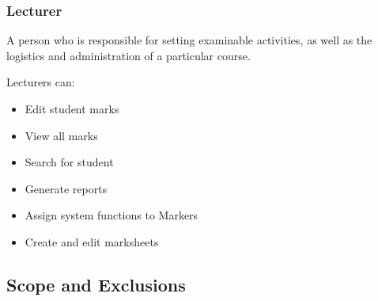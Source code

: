 \documentclass[a4paper]{article}
\begin{document}
			\subsubsection{Lecturer}
				\begin{flushleft}
				A person who is responsible for setting examinable activities, as well as the logistics and administration of a particular course. \linebreak 
				
				Lecturers can:
				\end{flushleft}
				\begin{itemize}

					\item{Edit student marks}
					
					\item{View all marks}
					
					\item{Search for student}
					
					\item{Generate reports}
					
					\item{Assign system functions to Markers}
					
					\item{Create and edit marksheets}

				\end{itemize}
			\subsection{Scope and Exclusions}
\end{document}
